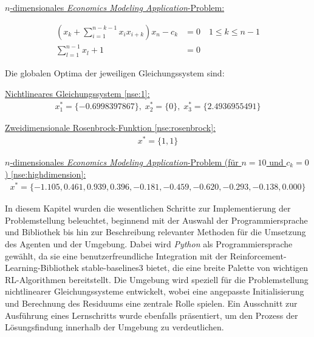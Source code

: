 \documentclass{article}
\theoremstyle{newline}
\begin{document}
\begin{onehalfspace}
\underline{$n$-dimensionales \textit{Economics Modeling Application}-Problem:} 

\begin{subequations}\label{nse:highdimension}
	\begin{align}
		\left( x_k + \sum_{i=1}^{n-k-1} x_i x_{i+k} \right) x_n - c_k &=0 \quad 1 \leq k \leq n-1\\
		\sum_{l=1}^{n-1} x_l + 1 &= 0
	\end{align}
\end{subequations}
\medskip

Die globalen Optima der jeweiligen Gleichungssystem sind:

\underline{Nichtlineares Gleichungssystem \ref{nse:1}:}
\vspace{-0.2cm}
\begin{align*}
	x^{\ast}_1 = \{-0.6998397867\},\; x^{\ast}_2 = \{0\},\; x^{\ast}_3 = \{2.4936955491\}
\end{align*}

\underline{Zweidimensionale Rosenbrock-Funktion \ref{nse:rosenbrock}:}
\vspace{-0.2cm}
\begin{align*}
	x^{\ast} = \{1, 1\}
\end{align*}

\underline{$n$-dimensionales \textit{Economics Modeling Application}-Problem (für $n=10$ und $c_k = 0$) \ref{nse:highdimension}:}
\vspace{-0.2cm}
\begin{align*}
	x^{\ast} = \{-1.105, 0.461, 0.939, 0.396, -0.181, -0.459, -0.620, -0.293, -0.138, 0.000\}
\end{align*}

In diesem Kapitel wurden die wesentlichen Schritte zur Implementierung der Problemstellung beleuchtet, beginnend mit der Auswahl der Programmiersprache und Bibliothek bis hin zur Beschreibung relevanter Methoden für die Umsetzung des Agenten und der Umgebung. Dabei wird \textit{Python} als Programmiersprache gewählt, da sie eine benutzerfreundliche Integration mit der Reinforcement-Learning-Bibliothek \glqq stable-baselines3\grqq{} bietet, die eine breite Palette von wichtigen RL-Algorithmen bereitstellt. Die Umgebung wird speziell für die Problemstellung nichtlinearer Gleichungssysteme entwickelt, wobei eine angepasste Initialisierung und Berechnung des Residuums eine zentrale Rolle spielen. Ein Ausschnitt zur Ausführung eines Lernschritts wurde ebenfalls präsentiert, um den Prozess der Lösungsfindung innerhalb der Umgebung zu verdeutlichen.


\end{onehalfspace}
\end{document}
